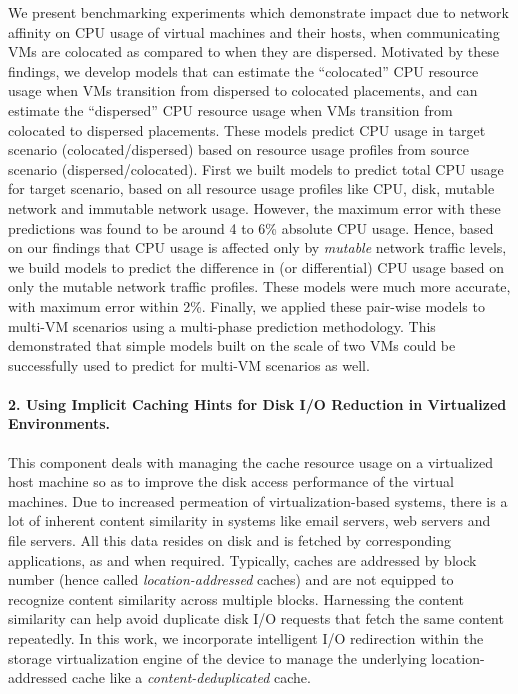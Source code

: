 We present benchmarking experiments
which demonstrate impact due to network affinity
on CPU usage of virtual machines and their hosts, when communicating
VMs are colocated as compared to
when they are dispersed. Motivated by these findings, we develop models
that can estimate the ``colocated'' CPU resource usage when VMs transition
from dispersed to colocated placements, and can estimate the ``dispersed''
CPU resource usage when VMs transition from colocated to dispersed
placements. These models predict CPU usage in target 
scenario (colocated/dispersed) based on resource usage profiles 
from source scenario (dispersed/colocated).
First we built models to predict total CPU usage for target scenario,
based on all resource usage profiles like CPU, disk, mutable network
and immutable network usage. However, the maximum error with these 
predictions was found to be around 4 to 6\% absolute CPU usage. 
Hence, based on our findings that CPU usage is affected only by
\textit{mutable} network traffic levels, we build models to 
predict the difference in (or differential) CPU usage based on only
the mutable network traffic profiles. These models were much more
accurate, with maximum error within 2\%. Finally, we applied these
pair-wise models to multi-VM scenarios using a multi-phase
prediction methodology. This demonstrated that simple models
built on the scale of two VMs could be successfully used to
predict for multi-VM scenarios as well.

\paragraph{2. Using Implicit Caching Hints for {D}isk I/O {R}eduction in Virtualized Environments.}
This component deals with managing the cache resource
usage on a virtualized host machine so as to improve the disk access performance 
of the virtual machines.
Due to increased permeation of virtualization-based systems, there is a lot of 
inherent content similarity in systems like email servers, web servers 
and file servers. All this data resides on disk and is fetched by corresponding
applications, as and when required. 
Typically, caches are addressed by block number (hence called 
\textit{location-addressed} caches) and are not
equipped to recognize content similarity across multiple blocks.
Harnessing the content similarity can help 
avoid duplicate disk I/O requests that fetch the same content repeatedly.
In this work, we incorporate intelligent I/O redirection within the 
storage virtualization engine of the device to manage the underlying 
location-addressed cache like a \textit{content-deduplicated} cache.

